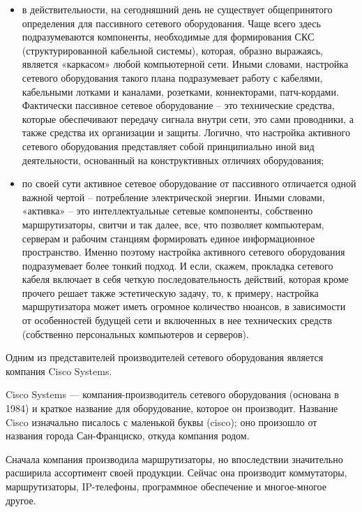 \documentclass[a4paper,14pt]{extreport}
\begin{document}
	\begin{itemize}
		\item в действительности, на сегодняшний день не существует общепринятого определения для пассивного сетевого оборудования. Чаще всего здесь подразумеваются компоненты, необходимые для формирования СКС (структурированной кабельной системы), которая, образно выражаясь, является «каркасом» любой компьютерной сети. Иными словами, настройка сетевого оборудования такого плана подразумевает работу с кабелями, кабельными лотками и каналами, розетками, коннекторами, патч-кордами. Фактически пассивное сетевое оборудование – это технические средства, которые обеспечивают передачу сигнала внутри сети, это сами проводники, а также средства их организации и защиты. Логично, что настройка активного сетевого оборудования представляет собой принципиально иной вид деятельности, основанный на конструктивных отличиях оборудования;
	
		\item по своей сути активное сетевое оборудование от пассивного отличается одной важной чертой – потребление электрической энергии. Иными словами, «активка» – это интеллектуальные сетевые компоненты, собственно маршрутизаторы, свитчи и так далее, все, что позволяет компьютерам, серверам и рабочим станциям формировать единое информационное пространство. Именно поэтому настройка активного сетевого оборудования подразумевает более тонкий подход. И если, скажем, прокладка сетевого кабеля включает в себя четкую последовательность действий, которая кроме прочего решает также эстетическую задачу, то, к примеру, настройка маршрутизатора может иметь огромное количество нюансов, в зависимости от особенностей будущей сети и включенных в нее технических средств (собственно персональных компьютеров и серверов). 
	\end{itemize}
	
	Одним из представителей производителей сетевого оборудования является компания Cisco Systems.
	
	Cisco Systems — компания-производитель сетевого оборудования (основана в 1984) и краткое название для оборудование, которое он производит. Название Cisco изначально писалось с маленькой буквы (cisco); оно произошло от названия города Сан-Франциско, откуда компания родом.
	
	Сначала компания производила маршрутизаторы, но впоследствии значительно расширила ассортимент своей продукции. Сейчас она производит коммутаторы, маршрутизаторы, IP-телефоны, программное обеспечение и многое-многое другое.
	
\end{document}
